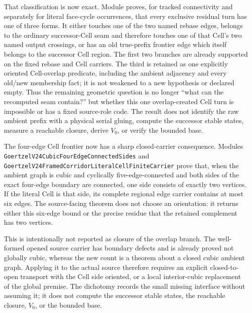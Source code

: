 \documentclass[11pt]{article}
\theoremstyle{definition}
\begin{document}
That classification is now exact.  Module
proves, for tracked connectivity and separately for literal face-cycle
occurrences, that every exclusive residual turn has one of three forms.  It
either touches one of the two named rebase edges, belongs to the ordinary
successor-Cell seam and therefore touches one of that Cell's two named output
crossings, or has an old true-prefix frontier edge which itself belongs to the
successor Cell region.  The first two branches are already supported on the
fixed rebase and Cell carriers.  The third is retained as one explicitly
oriented Cell-overlap predicate, including the ambient adjacency and every
old/new membership fact; it is not weakened to a new hypothesis or declared
empty.  Thus the remaining geometric question is no longer ``what can the
recomputed seam contain?'' but whether this one overlap-created Cell turn is
impossible or has a fixed source-role code.  The result does not identify the
raw ambient prefix with a physical serial gluing, compute the successor stable
states, measure a reachable closure, derive $V_0$, or verify the bounded base.

The four-edge Cell frontier now has a sharp closed-carrier consequence.
Modules
\texttt{GoertzelV24CubicFourEdgeConnectedSides} and
\texttt{GoertzelV24FramedCorridorLiteralCellFiniteCarrier} prove that, when
the ambient graph is cubic and cyclically five-edge-connected and both sides
of the exact four-edge boundary are connected, one side consists of exactly
two vertices.  If the literal Cell is that side, its complete regional edge
carrier contains at most six edges.  The source-facing theorem does not choose
an orientation: it returns either this six-edge bound or the precise residue
that the retained complement has two vertices.

This is intentionally not reported as closure of the overlap branch.  The
well-formed opened source carrier has boundary defects and is already proved
not globally cubic, whereas the new count is a theorem about a closed cubic
ambient graph.  Applying it to the actual source therefore requires an
explicit closed-to-open transport with the Cell side oriented, or a local
interior-cubic replacement of the global premise.  The dichotomy records the
small missing interface without assuming it; it does not compute the
successor stable states, the reachable closure, $V_0$, or the bounded base.
\end{document}
